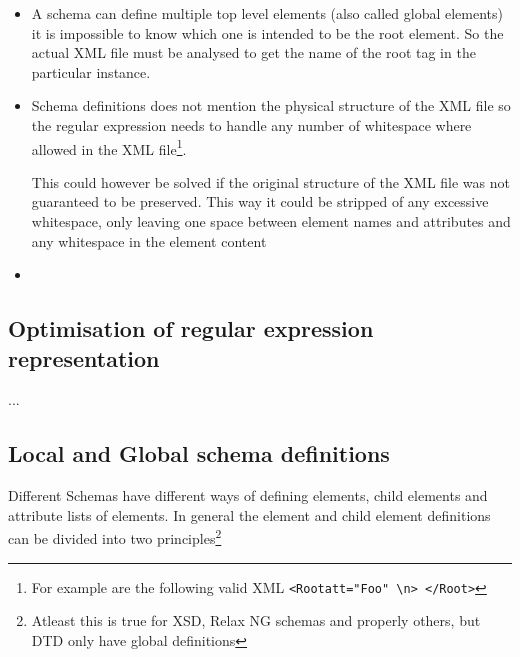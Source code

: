 \documentclass[a4paper, oneside]{memoir}
\theoremstyle{definition}
\begin{document}
  \begin{itemize}
  \item A schema can define multiple top level elements (also called global
    elements) it is impossible to know which one is intended to be the root
    element. So the actual XML file must be analysed to get the name of the root
    tag in the particular instance.

  \item Schema definitions does not mention the physical structure of the XML
    file so the regular expression needs to handle any number of whitespace
    where allowed in the XML file\footnote{For example are the following valid
      XML \texttt{<Root{\textvisiblespace}att="Foo"\textvisiblespace%
        \textvisiblespace\textbackslash{n}\textvisiblespace>\textvisiblespace%
        </Root\textvisiblespace\textvisiblespace>}}.

    This could however be solved if the original structure of the XML file was
    not guaranteed to be preserved. This way it could be stripped of any
    excessive whitespace, only leaving one space between element names and
    attributes and any whitespace in the element content

  \item 

  \end{itemize}
  

\subsection{Optimisation of regular expression representation}
...

\subsection{Local and Global schema definitions}
\label{sec:local-global-schema-definitions}
Different Schemas have different ways of defining elements, child elements and
attribute lists of elements. In general the element and child element
definitions can be divided into two principles\footnote{Atleast this is true for
  XSD, Relax NG schemas and properly others, but DTD only have global definitions}
\end{document}
